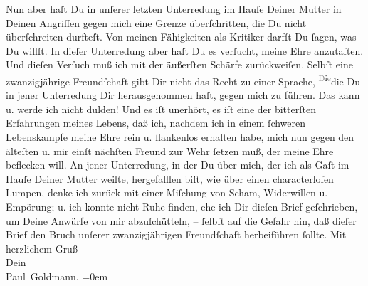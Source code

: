 \begin{ledgroupsized}[t]{13cm}
           \pstart
           Nun aber haſt Du in unſerer letzten Unterredung im Hauſe Deiner Mutter in Deinen Angriffen gegen mich eine Grenze
               überfchritten, die Du {\pb}nicht überſchreiten
               durfteſt. Von meinen Fähigkeiten als Kritiker darfſt Du ſagen, was Du willſt. In
               dieſer Unterredung aber haſt Du es verſucht, meine Ehre anzutaſten. Und dieſen
               Verſuch muß ich mit der äußerſten Schärfe zurückweiſen. Selbſt eine
               zwanzigjährige Freundſchaft gibt Dir nicht das Recht zu einer Sprache, \substVorne{}\textsuperscript{\textcolor{gray}{D}i\textcolor{gray}{e}}\substDazwischen{}die\substHinten{} Du in jener Unterredung Dir herausgenommen haſt, gegen mich zu führen. Das
               kann u. werde ich nicht {\pb}dulden! Und es iſt  unerhört, es iſt eine der bitterſten Erfahrungen
               meines Lebens, daß ich, nachdem ich in einem ſchweren Lebenskampfe meine Ehre rein u.
               flankenlos erhalten habe, mich nun gegen den älteſten u. mir einſt nächſten Freund
               zur Wehr ſetzen  muß, der meine Ehre \strikeout{\textcolor{gray}{bef}} beflecken will. An jener Unterredung, in der  Du über mich, der ich als Gaſt im Hauſe Deiner Mutter weilte, {\pb}\strikeout{\textcolor{gray}{×}\-\textcolor{gray}{×}\-\textcolor{gray}{×}\-\textcolor{gray}{×}\-\textcolor{gray}{×}\-\textcolor{gray}{×}\-\textcolor{gray}{×}} hergefalllen biſt, wie über einen characterloſen Lumpen, denke ich zurück mit
               einer Miſchung von Scham, Widerwillen u. Empörung; u. ich konnte nicht Ruhe finden,
               ehe ich Dir dieſen Brief geſchrieben, um Deine Anwürfe von mir abzuſchütteln, –
               ſelbſt auf die Gefahr hin, daß dieſer Brief den Bruch unſerer zwanzigjährigen
               Freundſchaft herbeiführen ſollte.\pend
           \pstart
           {\pb}Mit herzlichem Gruß {\\[\baselineskip]}Dein {\\[\baselineskip]}\spacefill\mbox{Paul Goldmann.}\pend
           \leftskip=0em{}
         
         \endnumbering{}\end{ledgroupsized}\begin{anhang}\end{anhang}\newcommand{\dateiname}{L03475}\newcommand{\titel}{Paul Goldmann an Arthur Schnitzler, 13. 1. 1911}\newcommand{\editorInnen}{Martin Anton Müller und Laura Untner}
      